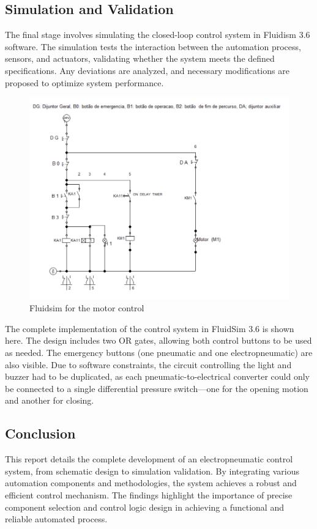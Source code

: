 \subsection{Simulation and Validation} \label{sec:Simulation_and_Validation}

The final stage involves simulating the closed-loop control system in Fluidism 3.6 software. 
The simulation tests the interaction between the automation process, sensors, and actuators, 
validating whether the system meets the defined specifications. Any deviations are analyzed, 
and necessary modifications are proposed to optimize system performance.

\begin{figure}[H]
    \includegraphics[width=16cm]{Images/Q2/fluidsim.png}
    \centering
    \caption{Fluidsim for the motor control}
    \label{fig:fluidsim}
\end{figure}

The complete implementation of the control system in FluidSim 3.6 is shown here. The design includes two OR gates, 
allowing both control buttons to be used as needed. The emergency buttons (one pneumatic and one electropneumatic) 
are also visible. Due to software constraints, the circuit controlling the light and buzzer had to be duplicated, as 
each pneumatic-to-electrical converter could only be connected to a single differential pressure switch—one for the 
opening motion and another for closing.\\

\subsection{Conclusion}

This report details the complete development of an electropneumatic control system, from schematic 
design to simulation validation. By integrating various automation components and methodologies, 
the system achieves a robust and efficient control mechanism. The findings highlight the importance 
of precise component selection and control logic design in achieving a functional and reliable 
automated process.